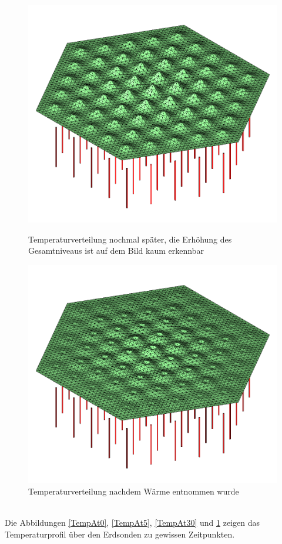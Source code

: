 \documentclass[12pt,a4paper]{article}
\begin{document}
 \begin{figure}[h]
    \begin{minipage}[t]{.4\linewidth} %
       \includegraphics[width=\linewidth]{TempAt30.png}
       \caption{Temperaturverteilung nochmal später, die Erhöhung des Gesamtniveaus ist auf dem Bild kaum erkennbar}
       \label{TempAt30}
    \end{minipage}
    \hspace{.1\linewidth}%
    \begin{minipage}[t]{.4\linewidth} %
       \includegraphics[width=\linewidth]{TempAt30m.png}
       \caption{Temperaturverteilung nachdem Wärme entnommen wurde}
       \label{TempAt30m}
    \end{minipage}
\end{figure}\\
Die Abbildungen \ref{TempAt0}, \ref{TempAt5}, \ref{TempAt30} und \ref{TempAt30m} zeigen das Temperaturprofil über den Erdsonden zu gewissen Zeitpunkten.
\end{document}
